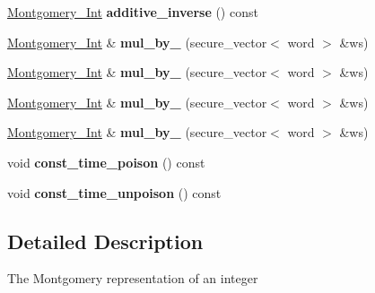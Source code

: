 \begin{DoxyCompactItemize}
\item 
\mbox{\label{class_botan_1_1_montgomery___int_a6b2ef62e6caa40b808c29a761575e631}} 
\mbox{\hyperlink{class_botan_1_1_montgomery___int}{Montgomery\+\_\+\+Int}} {\bfseries additive\+\_\+inverse} () const
\item 
\mbox{\label{class_botan_1_1_montgomery___int_a99d94471337664d5b745c41b5b6ab17c}} 
\mbox{\hyperlink{class_botan_1_1_montgomery___int}{Montgomery\+\_\+\+Int}} \& {\bfseries mul\+\_\+by\+\_} (secure\+\_\+vector$<$ word $>$ \&ws)
\item 
\mbox{\label{class_botan_1_1_montgomery___int_a7a73d6ef76eca643f91e9ab4c99fe371}} 
\mbox{\hyperlink{class_botan_1_1_montgomery___int}{Montgomery\+\_\+\+Int}} \& {\bfseries mul\+\_\+by\+\_} (secure\+\_\+vector$<$ word $>$ \&ws)
\item 
\mbox{\label{class_botan_1_1_montgomery___int_acadd6e7cebdcb65a14103504b16e83ce}} 
\mbox{\hyperlink{class_botan_1_1_montgomery___int}{Montgomery\+\_\+\+Int}} \& {\bfseries mul\+\_\+by\+\_} (secure\+\_\+vector$<$ word $>$ \&ws)
\item 
\mbox{\label{class_botan_1_1_montgomery___int_a835c59e9288cbdf096c55ab75223ec9b}} 
\mbox{\hyperlink{class_botan_1_1_montgomery___int}{Montgomery\+\_\+\+Int}} \& {\bfseries mul\+\_\+by\+\_} (secure\+\_\+vector$<$ word $>$ \&ws)
\item 
\mbox{\label{class_botan_1_1_montgomery___int_a88483a5fe1f2b2617efae821d7682c5c}} 
void {\bfseries const\+\_\+time\+\_\+poison} () const
\item 
\mbox{\label{class_botan_1_1_montgomery___int_ac49ee67b58c3eb80d5f7b5ded43b54a1}} 
void {\bfseries const\+\_\+time\+\_\+unpoison} () const
\end{DoxyCompactItemize}


\subsection{Detailed Description}
The Montgomery representation of an integer 

